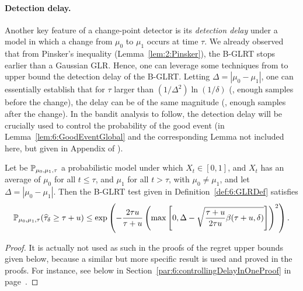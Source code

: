 \paragraph{Detection delay.}

Another key feature of a change-point detector is its \emph{detection delay} under a model in which a change from $\mu_0$ to $\mu_1$ occurs at time $\tau$. We already observed that from Pinsker's inequality (Lemma~\ref{lem:2:Pinsker}), the B-GLRT stops earlier than a Gaussian GLR. Hence, one can leverage some techniques from \cite{Maillard2018GLR} to upper bound the detection delay of the B-GLRT. Letting $\Delta = |\mu_0 - \mu_1|$, one can essentially establish that for $\tau$ larger than $(1/\Delta^2)\ln(1/\delta)$ (\ie, enough samples before the change), the delay can be of the same magnitude (\ie, enough samples after the change).
In the bandit analysis to follow, the detection delay will be crucially used to control the probability of the good event (in Lemma~\ref{lem:6:GoodEventGlobal} and the corresponding Lemma not included here, but given in Appendix of \cite{Besson2019GLRT}).

\begin{lemma}\label{lem:6:Delay}
    Let be $\mathbb{P}_{\mu_0,\mu_1,\tau}$ a probabilistic model under which $X_t \in [0,1]$, and $X_t$ has an average of $\mu_0$ for all $t \leq \tau$, and $\mu_1$ for all $t > \tau$, with $\mu_0 \neq \mu_1$,
    and let $\Delta = |\mu_0 - \mu_1|$.
    Then the B-GLRT test given in Definition~\ref{def:6:GLRDef} satisfies
    \begin{equation}
        \mathbb{P}_{\mu_0,\mu_1,\tau} (\widehat{\tau}_{\delta} \geq \tau + u) \leq \exp\left( -\frac{2\tau u}{\tau + u}\left(\max\left[ 0, \Delta - \sqrt{\frac{\tau + u}{2\tau u} \beta(\tau + u,\delta)} \right]\right)^2 \right).
    \end{equation}
\end{lemma}
%
\begin{proof}
    It is actually not used as such in the proofs of the regret upper bounds given below, because a similar but more specific result is used and proved in the proofs.
    For instance, see below in Section~\ref{par:6:controllingDelayInOneProof} in page~\pageref{par:6:controllingDelayInOneProof}.
\end{proof}


